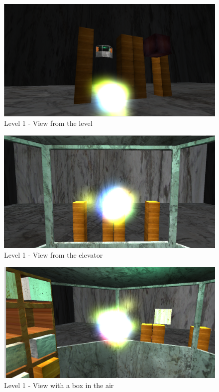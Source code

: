 \documentclass[a4paper]{article}
\begin{document}


\begin{figure}[htbp]
	\centering
		\includegraphics[width=1.0\textwidth]{level1-1.png}
	\caption{Level 1 - View from the level}
\end{figure}

\begin{figure}[htbp]
	\centering
		\includegraphics[width=1.0\textwidth]{level1-2.png}
	\caption{Level 1 - View from the elevator}
\end{figure}

\begin{figure}[htbp]
	\centering
		\includegraphics[width=1.0\textwidth]{level1-3.png}
	\caption{Level 1 - View with a box in the air}
\end{figure}
\end{document}
